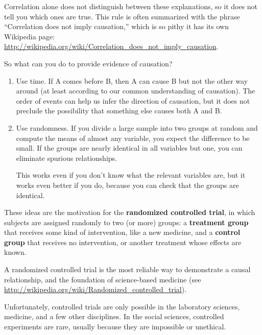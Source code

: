 Correlation alone does not distinguish between these explanations,
so it does not tell you which ones are true.
This rule is often summarized with the phrase ``Correlation
does not imply causation,'' which is so pithy it has its own
Wikipedia page: \url{http://wikipedia.org/wiki/Correlation_does_not_imply_causation}.

So what can you do to provide evidence of causation?

\begin{enumerate}

\item Use time.  If A comes before B, then A can cause B but not the
  other way around (at least according to our common understanding of
  causation).  The order of events can help us infer the direction
  of causation, but it does not preclude the possibility that something
  else causes both A and B.

\item Use randomness.  If you divide a large sample into two
  groups at random and compute the means of almost any variable, you
  expect the difference to be small.
  If the groups are nearly identical in all variables but one, you
  can eliminate spurious relationships.

  This works even if you don't know what the relevant variables
  are, but it works even better if you do, because you can check that
  the groups are identical.

\end{enumerate}

These ideas are the motivation for the {\bf randomized controlled
trial}, in which subjects are assigned randomly to two (or more)
groups: a {\bf treatment group} that receives some kind of intervention,
like a new medicine, and a {\bf control group} that receives
no intervention, or another treatment whose effects are known.

A randomized controlled trial is the most reliable way to demonstrate
a causal relationship, and the foundation of science-based medicine
(see \url{http://wikipedia.org/wiki/Randomized_controlled_trial}).

Unfortunately, controlled trials are only possible in the laboratory
sciences, medicine, and a few other disciplines.  In the social sciences,
controlled experiments are rare, usually because they are impossible
or unethical.

